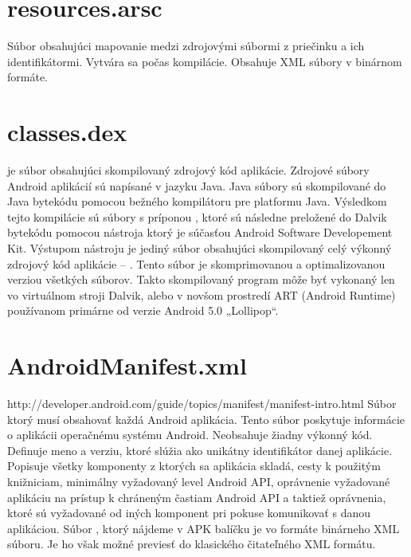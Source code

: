 \section{resources.arsc}
Súbor obsahujúci mapovanie medzi zdrojovými súbormi  z priečinku  a ich identifikátormi.  Vytvára sa počas kompilácie. Obsahuje XML súbory v binárnom formáte.

\section{classes.dex}
 je súbor obsahujúci skompilovaný zdrojový kód aplikácie.  Zdrojové súbory Android aplikácií sú napísané v jazyku Java. Java súbory sú skompilované do Java bytekódu pomocou bežného kompilátoru pre platformu Java. Výsledkom tejto kompilácie sú súbory s príponou , ktoré sú následne preložené do Dalvik bytekódu pomocou nástroja  ktorý je súčasťou Android Software Developement Kit. Výstupom nástroju  je jediný súbor obsahujúci skompilovaný celý výkonný zdrojový kód aplikácie -- . Tento súbor je skomprimovanou a optimalizovanou verziou všetkých  súborov. Takto skompilovaný program môže byť vykonaný len vo virtuálnom stroji Dalvik, alebo v novšom prostredí ART (Android Runtime) používanom primárne od verzie Android 5.0 „Lollipop“.

\section{AndroidManifest.xml} 

http://developer.android.com/guide/topics/manifest/manifest-intro.html
Súbor ktorý musí obsahovať každá Android aplikácia. Tento súbor poskytuje informácie o aplikácii operačnému systému Android. Neobsahuje žiadny výkonný kód. Definuje meno a verziu, ktoré slúžia ako unikátny identifikátor danej aplikácie. Popisuje všetky komponenty z ktorých sa aplikácia skladá, cesty k použitým knižniciam, minimálny vyžadovaný level Android API, oprávnenie vyžadované aplikáciu na prístup k chráneným častiam Android API a taktiež oprávnenia, ktoré sú vyžadované od iných komponent pri pokuse komunikovať s danou aplikáciou. Súbor , ktorý nájdeme v APK balíčku je vo formáte binárneho XML súboru. Je ho však možné previesť do klasického čitateľného XML formátu.

